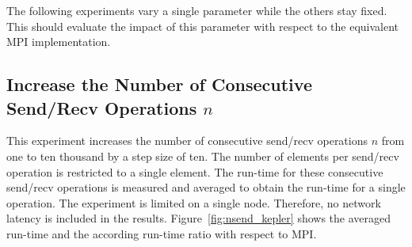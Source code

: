 \noindent The following experiments vary a single parameter while the
others stay fixed. This should evaluate the impact of this parameter
with respect to the equivalent MPI implementation.

\subsection*{Increase the Number of Consecutive Send/Recv Operations $n$}
This experiment increases the number of consecutive send/recv
operations $n$ from one to ten thousand by a step size of ten. The number of
elements per send/recv operation is restricted to a single
element. The run-time for these consecutive send/recv operations is
measured and averaged to obtain the run-time for a single operation.
The experiment is limited on a single node. Therefore, no network
latency is included in the results.  Figure~\ref{fig:nsend_kepler}
shows the averaged run-time and the according
run-time ratio with respect to MPI.

